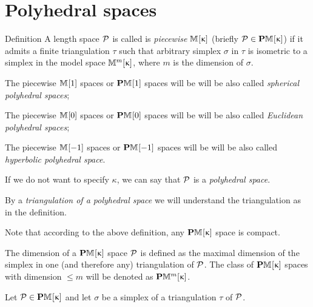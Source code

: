  
\qeds

\section{Polyhedral spaces}

\begin{thm}{Definition}\label{def:poly}
A length space $\mathcal{P}$ is called
is  \emph{piecewise $\mathbb{M}_{{}}^{}[{\upkappa}]$} (briefly $\spc{P}\in \PM{}\kappa$)
if it admits a finite triangulation $\tau$ 
such that arbitrary simplex $\sigma$ in $\tau$ is isometric to a simplex in the model space $\mathbb{M}_{{}}^{m}[{\upkappa}]$, 
where $m$ is the dimension of $\sigma$.

\begin{subthm}{}
The piecewise $\mathbb{M}_{{}}^{}[{1}]$ spaces or $\mathbf{P}\mathbb{M}_{{}}^{}[{1}]$ spaces will be 
will be also called 
\emph{spherical polyhedral spaces};
\end{subthm}

\begin{subthm}{}
The piecewise $\mathbb{M}_{{}}^{}[{0}]$ spaces or $\mathbf{P}\mathbb{M}_{{}}^{}[{0}]$ spaces will be 
will be also called 
\emph{Euclidean polyhedral spaces};
\end{subthm}

\begin{subthm}{}
The piecewise $\mathbb{M}_{{}}^{}[{-1}]$ spaces or $\mathbf{P}\mathbb{M}_{{}}^{}[{-1}]$ spaces will be 
will be also called 
\emph{hyperbolic polyhedral space}.
\end{subthm}

If we do not want to specify $\kappa$, we can say that $\mathcal{P}$ is a \emph{polyhedral space}.

By a \emph{triangulation of a polyhedral space} we will understand the triangulation as in the definition. 

\end{thm}

Note that according to the above definition,
any $\mathbf{P}\mathbb{M}_{{}}^{}[{\upkappa}]$ space is compact. 

The dimension of a $\mathbf{P}\mathbb{M}_{{}}^{}[{\upkappa}]$ space $\mathcal{P}$
is defined as the maximal dimension of the simplex 
in one (and therefore any) triangulation of $\mathcal{P}$.
The class of $\mathbf{P}\mathbb{M}_{{}}^{}[{\upkappa}]$ spaces 
with dimension $\le m$ will be denoted 
as $\mathbf{P}\mathbb{M}_{{}}^{m}[{\upkappa}]$.


Let $\spc{P}\in \PM{}\kappa$
and let $\sigma$ be a simplex of a triangulation $\tau$ of $\mathcal{P}$.

